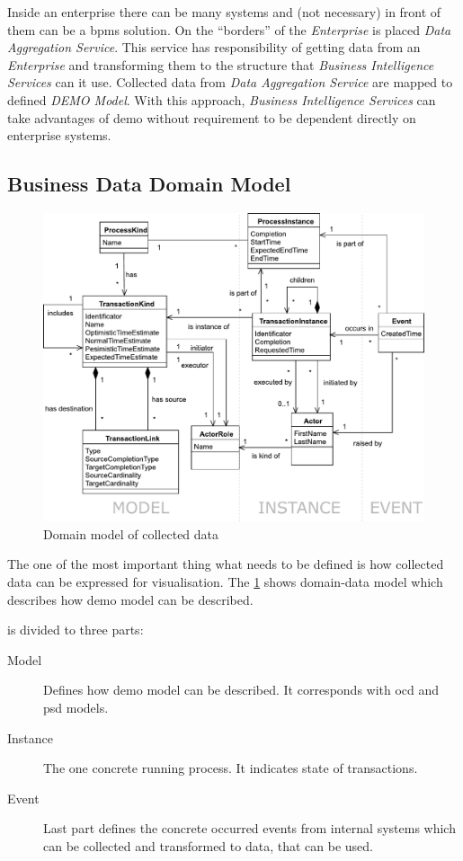 Inside an enterprise there can be many systems and (not necessary) in front of them can be a \gls{bpms} solution. On the ``borders'' of the \textit{Enterprise} is placed \textit{Data Aggregation Service}. This service has responsibility of getting data from an \textit{Enterprise} and transforming them to the structure that \textit{Business Intelligence Services} can it use. Collected data from \textit{Data Aggregation Service} are mapped to defined \textit{DEMO Model}.
With this approach, \textit{Business Intelligence Services} can take advantages of \gls{demo} without requirement to be dependent directly on enterprise systems.

\subsection{Business Data Domain Model}
\begin{figure}[ht!]
  \centering
  \includegraphics[width=13cm,keepaspectratio]{img/domain-data-model}
  \caption{Domain model of collected data}
  \label{fig:domain-data-model}
\end{figure}    

The one of the most important thing what needs to be defined is how collected data can be expressed for visualisation. The \cref{fig:domain-data-model} shows domain-data model which describes how \gls{demo} model can be described.  

 is divided to three parts:
\begin{description}
\item[Model] Defines how \gls{demo} model can be described. It corresponds with \gls{ocd} and \gls{psd} models.
\item[Instance] The one concrete running process. It indicates state of transactions. 
\item[Event] Last part defines the concrete occurred events from internal systems which can be collected and transformed to data, that can be used. 
\end{description}

